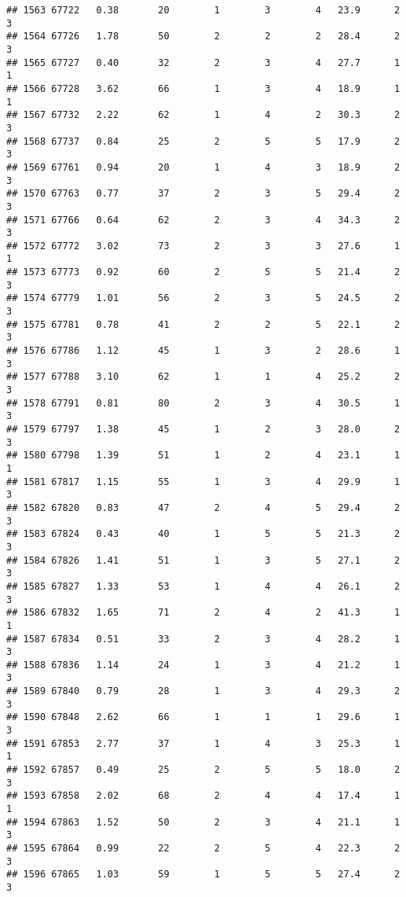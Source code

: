 \documentclass[
]{article}
\begin{document}
\begin{verbatim}
## 1563 67722   0.38       20        1        3        4   23.9      2      3
## 1564 67726   1.78       50        2        2        2   28.4      2      3
## 1565 67727   0.40       32        2        3        4   27.7      1      1
## 1566 67728   3.62       66        1        3        4   18.9      1      1
## 1567 67732   2.22       62        1        4        2   30.3      2      3
## 1568 67737   0.84       25        2        5        5   17.9      2      3
## 1569 67761   0.94       20        1        4        3   18.9      2      3
## 1570 67763   0.77       37        2        3        5   29.4      2      3
## 1571 67766   0.64       62        2        3        4   34.3      2      3
## 1572 67772   3.02       73        2        3        3   27.6      1      1
## 1573 67773   0.92       60        2        5        5   21.4      2      3
## 1574 67779   1.01       56        2        3        5   24.5      2      3
## 1575 67781   0.78       41        2        2        5   22.1      2      3
## 1576 67786   1.12       45        1        3        2   28.6      1      3
## 1577 67788   3.10       62        1        1        4   25.2      2      3
## 1578 67791   0.81       80        2        3        4   30.5      1      3
## 1579 67797   1.38       45        1        2        3   28.0      2      3
## 1580 67798   1.39       51        1        2        4   23.1      1      1
## 1581 67817   1.15       55        1        3        4   29.9      1      3
## 1582 67820   0.83       47        2        4        5   29.4      2      3
## 1583 67824   0.43       40        1        5        5   21.3      2      3
## 1584 67826   1.41       51        1        3        5   27.1      2      3
## 1585 67827   1.33       53        1        4        4   26.1      2      3
## 1586 67832   1.65       71        2        4        2   41.3      1      1
## 1587 67834   0.51       33        2        3        4   28.2      1      3
## 1588 67836   1.14       24        1        3        4   21.2      1      3
## 1589 67840   0.79       28        1        3        4   29.3      2      3
## 1590 67848   2.62       66        1        1        1   29.6      1      3
## 1591 67853   2.77       37        1        4        3   25.3      1      1
## 1592 67857   0.49       25        2        5        5   18.0      2      3
## 1593 67858   2.02       68        2        4        4   17.4      1      1
## 1594 67863   1.52       50        2        3        4   21.1      1      3
## 1595 67864   0.99       22        2        5        4   22.3      2      3
## 1596 67865   1.03       59        1        5        5   27.4      2      3

\end{verbatim}
\end{document}

